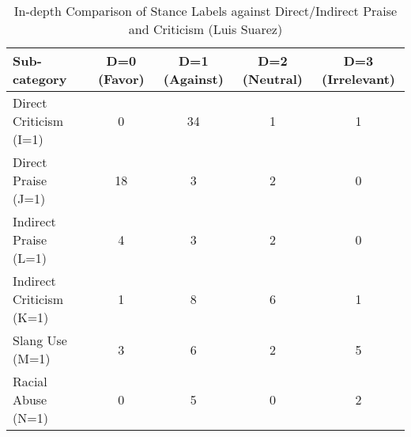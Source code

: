 \documentclass{article}
\begin{document}
\FloatBarrier %

\begin{table}[htbp] %
    \centering %
    \caption{In-depth Comparison of Stance Labels against Direct/Indirect Praise and Criticism (Luis Suarez) } %
    \label{tab:statistical_summary_d} %
    \renewcommand{\arraystretch}{1.2} %
    \begin{adjustbox}{max width=\linewidth} %
        \begin{tabular}{l c c c c} %
            \toprule %
            \textbf{Sub-category} & \textbf{D=0 (Favor)} & \textbf{D=1 (Against)} & \textbf{D=2 (Neutral)} & \textbf{D=3 (Irrelevant)} \\ %
            \midrule %
            Direct Criticism (I=1)  & 0  & 34 & 1  & 1 \\
            Direct Praise (J=1)     & 18 & 3  & 2  & 0 \\
            Indirect Praise (L=1)   & 4  & 3  & 2  & 0 \\
            Indirect Criticism (K=1) & 1  & 8  & 6  & 1 \\
            Slang Use (M=1)         & 3  & 6  & 2  & 5 \\
            Racial Abuse (N=1)      & 0  & 5  & 0  & 2 \\
            \bottomrule %
        \end{tabular}
    \end{adjustbox}
\end{table}

\FloatBarrier %
\end{document}

